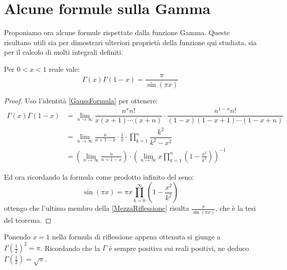 \section{Alcune formule sulla Gamma}
Proponiamo ora alcune formule rispettate dalla funzione Gamma. Queste risultano utili sia per dimostrari ulteriori proprietà della
funzione qui studiata, sia per il calcolo di molti integrali definiti.

\begin{theorem} \label{Riflessione}
	Per $0<x<1$ reale vale:
	\begin{equation*}
		\Gamma(x)\Gamma(1-x)=\frac{\pi}{\sin(\pi x)}
	\end{equation*}
\end{theorem}
\begin{proof}
	Uso l'identità \cref{GaussFormula} per ottenere:
	\begin{equation}\begin{split} \label{MezzaRiflessione}
		\Gamma(x)\Gamma(1-x) & = \lim_{n\to\infty} \dfrac{n^xn!}{x(x+1)\cdots (x+n)} \cdot 
		\dfrac{n^{1-x}n!}{(1-x)(1-x+1)\cdots (1-x+n)}\\
		& =\lim_{n\to\infty} \frac{n}{n+1-x} \cdot \frac{1}{x} \cdot \prod_{k=1}^{n}\dfrac{k^2}{k^2-x^2} \\
		& =\left(\lim_{n\to\infty} \frac{n}{n+1-x} \right) \cdot 
		\left( \lim_{n\to\infty} x \prod_{k=1}^{n}\left(1-\frac{x^2}{k^2}\right) \right)^{-1}
	\end{split}\end{equation}

	Ed ora ricordando la formula come prodotto infinito del seno:
	\begin{equation*}
		\sin(\pi x)=\pi x \prod_{k=0}^{\infty} \left(1-\frac{x^2}{k^2}\right)
	\end{equation*}
	ottengo che l'ultimo membro della \cref{MezzaRiflessione} risulta $\frac{\pi}{\sin(\pi x)}$, che è la tesi del teorema.
\end{proof}

\begin{remark}
	Ponendo $x=1$ nella formula di riflessione appena ottenuta si giunge a $\Gamma\left(\frac12\right)^2=\pi$. 
	Ricordando che la $\Gamma$ è sempre positiva sui reali positivi, ne deduco $\Gamma\left(\frac12\right)=\sqrt\pi$.
\end{remark}


